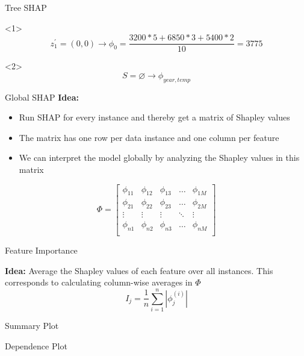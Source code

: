 \documentclass[11pt,compress,t,notes=noshow, aspectratio=169, xcolor=table]{beamer}
\begin{document}
\begin{vbframe}{Tree SHAP}
\begin{onlyenv}<1>
$$
z^{\prime}_1 = (0, 0) \rightarrow \phi_0 = \frac{3200*5 + 6850*3 +5400*2}{10}= 3775
$$
\end{onlyenv}

\begin{onlyenv}<2>
$$
S = \varnothing \rightarrow \phi_{year, temp}
$$
\end{onlyenv}

\end{vbframe}

 \begin{vbframe}{Global SHAP}
\textbf{Idea: }
\begin{itemize}
    \item Run SHAP for every instance and thereby get a matrix of Shapley values
    \item The matrix has one row per data instance and one column per feature
    \item We can interpret the model globally by analyzing the Shapley values in this matrix
\end{itemize}
\vspace{2cm}
$$
\Phi =
\begin{bmatrix}
    \phi_{11} & \phi_{12} & \phi_{13} & \dots  & \phi_{1M} \\
    \phi_{21} & \phi_{22} & \phi_{23} & \dots  & \phi_{2M} \\
    \vdots & \vdots & \vdots & \ddots & \vdots \\
    \phi_{n1} & \phi_{n2} & \phi_{n3} & \dots  & \phi_{nM} \\
\end{bmatrix}
$$

 \end{vbframe}

 \begin{vbframe}{Feature Importance}
 
\textbf{Idea:} Average the Shapley values of each feature over all instances. This corresponds to calculating column-wise averages in $\Phi$
$$
I_{j}=\frac{1}{n} \sum_{i=1}^{n}\left|\phi_{j}^{(i)}\right|
$$
\end{vbframe}
 
\begin{vbframe}{Summary Plot}
\end{vbframe} 

\begin{vbframe}{Dependence Plot}
\end{vbframe}
\end{document}
